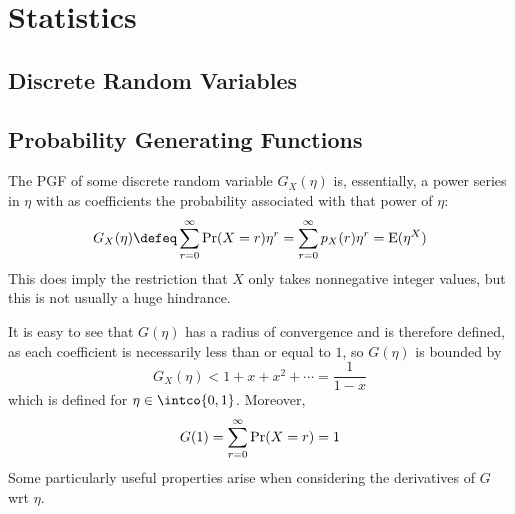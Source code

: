 \section{Statistics}

\subsection{Discrete Random Variables}

\subsection{Probability Generating Functions}

The PGF of some discrete random variable \(G_X(\eta)\) is, essentially, a power
series in \(\eta\) with as coefficients the probability associated with that
power of \(\eta\):
\begin{equation*}
G_X(\eta) \defeq \sum_{r = 0}^\infty \Prob(X = r)\eta^r
    = \sum_{r = 0}^\infty p_X(r)\eta^r
    = \Expect(\eta^X)
\end{equation*}
This does imply the restriction that \(X\) only takes
nonnegative integer values, but this is not usually a huge hindrance.

It is easy to see that \(G(\eta)\) has a radius of convergence and is therefore
defined, as each coefficient is necessarily less than or equal to \(1\), so
\(G(\eta)\) is bounded by
\begin{equation*}
G_X(\eta) < 1 + x + x^2 + \dotsb = \frac 1{1 - x}
\end{equation*}
which is defined for \(\eta \in \intco{0, 1}\). Moreover,
\begin{equation*}
G(1) = \sum_{r = 0}^\infty \operatorname{Pr}(X = r) = 1
\end{equation*}
Some particularly useful properties arise when considering the derivatives of
\(G\) wrt \(\eta\).


